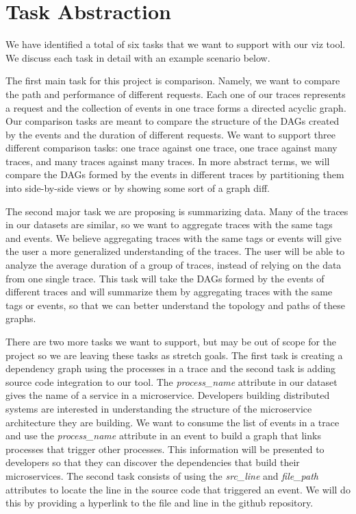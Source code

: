 \section{Task Abstraction}

We have identified a total of six tasks that we want to support with our viz tool.
We discuss each task in detail with an example scenario below.

The first main task for this project is comparison. Namely, we want to compare the path and performance of different
requests. Each one of our traces represents a request and the collection of events in one trace forms a directed acyclic graph. Our
comparison tasks are meant to compare the structure of the DAGs created by the events and the duration of different requests. 
We want to support three different comparison tasks: one trace against one trace, one trace against many traces, and many traces
against many traces. In more abstract terms, we will compare the DAGs formed by the events in different traces by partitioning them
into side-by-side views or by showing some sort of a graph diff.

The second major task we are proposing is summarizing data. Many of the traces in our datasets are similar, so we want to
aggregate traces with the same tags and events. We believe aggregating traces with the same tags or events will give the user
a more generalized understanding of the traces. The user will be able to analyze the average duration of a group of traces, instead
of relying on the data from one single trace. This task will take the DAGs formed by the events of different traces and will summarize
them by aggregating traces with the same tags or events, so that we can better understand the topology and paths of these graphs.

There are two more tasks we want to support, but may be out of scope for the project so we are leaving these tasks as stretch goals.
The first task is creating a dependency graph using
the processes in a trace and the second task is adding source code integration to our tool. The \textit{process\_name} attribute in 
our dataset gives the name of a service in a microservice.
Developers building distributed systems are interested in understanding the structure of the microservice
architecture they are building. We want to consume the list of events in a trace and use the \textit{process\_name} attribute in an 
event to build a graph that links processes that trigger other processes. This information will be presented to developers so that 
they can discover the dependencies that build their microservices. 
The second task consists of using the \textit{src\_line} and \textit{file\_path}
attributes to locate the line in the source code that triggered an event. We will do this by providing a hyperlink to the file and line
in the github repository. 

